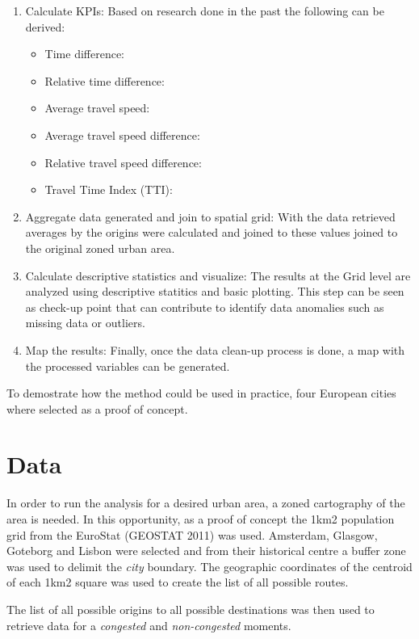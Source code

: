 \documentclass[a4paper]{jpconf}
\begin{document}
\begin{enumerate}[label=\arabic*)]
	\item Calculate KPIs: Based on research done in the past the following can be derived:
		\begin{itemize}
			\item Time difference:			
			\item Relative time difference:
			\item Average travel speed:
			\item Average travel speed difference:
			\item Relative travel speed difference:
			\item Travel Time Index (TTI):			
		\end{itemize}	
	\item Aggregate data generated and join to spatial grid: With the data retrieved averages by the origins were calculated and joined to these values joined to the original zoned urban area. 
	\item Calculate descriptive statistics and visualize: The results at the Grid level are analyzed using descriptive statitics and basic plotting. This step can be seen as check-up point that can contribute to identify data anomalies such as missing data or outliers. 
	\item Map the results: Finally, once the data clean-up process is done, a map with the processed variables can be generated.
\end{enumerate}

\indent To demostrate how the method could be used in practice, four European cities where selected as a proof of concept.\par


\section{Data}
\indent In order to run the analysis for a desired urban area, a zoned cartography of the area is needed. In this opportunity, as a proof of concept the 1km2 population grid from the EuroStat (GEOSTAT 2011) was used. Amsterdam, Glasgow, Goteborg and Lisbon were selected and from their historical centre a buffer zone was used to delimit the \textit{city} boundary. The geographic coordinates of the centroid of each 1km2 square was used to create the list of all possible routes. \par
\indent The list of all possible origins to all possible destinations was then used to retrieve data for a \textit{congested} and \textit{non-congested} moments. 
\end{document}
